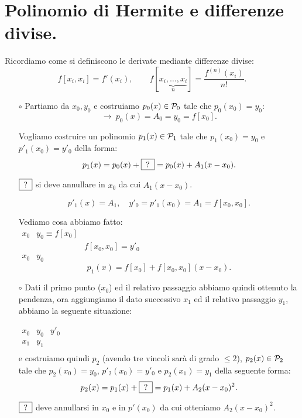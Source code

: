 \section{Polinomio di Hermite e differenze divise.}
Ricordiamo come si definiscono le derivate mediante differenze divise:
\[
f[x_i, x_i] = f'(x_i), \qquad f[\underbrace{x_i, \ldots, x_i}_{n}] =
\frac{f^{(n)}(x_i)}{n!}.
\]

\begin{itemize}
\item[$\circ$]
Partiamo da $x_0, y_0$ e costruiamo $p_0(x) \in \mathcal{P}_0$ tale che $p_0(x_0)=y_0$:
\[\longrightarrow \ p_0(x) = A_0 = y_0 = f[x_0]. \]

Vogliamo costruire un polinomio $p_1(x) \in \mathcal{P}_1$ tale che $p_1(x_0) = y_0$
e $p'_1(x_0) = y'_0$ della forma:
\[
p_1(x) = p_0(x) + \framebox[3.5\width]{\textrm{?}} = p_0(x) + A_1(x-x_0).
\]

$\framebox[3.5\width]{\textrm{?}}$ si deve annullare in $x_0$ da cui
$A_1(x-x_0)$.

\[
p'_1(x) = A_1, \quad y'_0 = p'_1(x_0) = A_1 = f[x_0,x_0].
\]

Vediamo cosa abbiamo fatto:\\

$\begin{array}{llcc}
x_0 & y_0 \equiv f[x_0]  &   \\
    &     & f[x_0,x_0] = y'_0 \\
x_0 & y_0
\end{array}$
\[p_1(x) = f[x_0] + f[x_0,x_0](x-x_0).\]

\item[$\circ$]
Dati il primo punto ($x_0$) ed il relativo passaggio abbiamo quindi ottenuto
la pendenza, ora aggiungiamo il dato successivo $x_1$ ed il relativo passaggio
$y_1$, abbiamo la seguente situazione:

$\begin{array}{lllc}
x_0 & y_0  & y'_0  \\
x_1 & y_1     \\
\end{array}$\\
e costruiamo quindi $p_2$ (avendo tre vincoli sarà di grado $\leq 2$),
$p_2(x) \in \mathcal{P}_2$ tale che $p_2(x_0) = y_0$, $p'_2(x_0) = y'_0$ e $p_2(x_1) =
y_1$ della seguente forma:
\[
p_2(x) = p_1(x) + \framebox[3.5\width]{\textrm{?}} = p_1(x) + A_2(x-x_0)^2.
\]

$\framebox[3.5\width]{\textrm{?}}$ deve annullarsi in $x_0$ e in $p'(x_0)$
da cui otteniamo $A_2(x-x_0)^2$.


\end{itemize}
